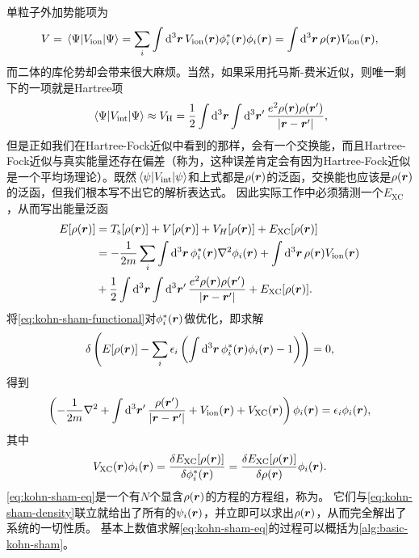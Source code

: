 单粒子外加势能项为
\begin{equation}
    V = \mel{\Psi}{{V}_\text{ion}}{\Psi} = \sum_i \int \dd[3]{\vb*{r}} V_{\text{ion}}(\vb*{r}) \phi_i^*(\vb*{r}) \phi_i(\vb*{r}) = \int \dd[3]{\vb*{r}} \rho(\vb*{r}) V_\text{ion}(\vb*{r}),
\end{equation}
而二体的库伦势却会带来很大麻烦。当然，如果采用托马斯-费米近似，则唯一剩下的一项就是Hartree项
\begin{equation}
    \mel{\Psi}{{V}_\text{int}}{\Psi} \approx V_{\text{H}} = \frac{1}{2} \int \dd[3]{\vb*{r}} \int \dd[3]{\vb*{r}'} \frac{e^2 \rho(\vb*{r}) \rho(\vb*{r}')}{\abs{\vb*{r} - \vb*{r}'}},
\end{equation}
但是正如我们在Hartree-Fock近似中看到的那样，会有一个交换能，而且Hartree-Fock近似与真实能量还存在偏差（称为，这种误差肯定会有因为Hartree-Fock近似是一个平均场理论）。既然$\mel{\psi}{{V}_\text{int}}{\psi}$和上式都是$\rho(\vb*{r})$的泛函，交换能也应该是$\rho(\vb*{r})$的泛函，但我们根本写不出它的解析表达式。
因此实际工作中必须猜测一个$E_\text{XC}$，从而写出能量泛函
\begin{equation}
    \begin{aligned}
        E[\rho(\vb*{r})] &= T_\text{s}[\rho(\vb*{r})] + V[\rho(\vb*{r})] + V_H[\rho(\vb*{r})] + E_\text{XC} [\rho(\vb*{r})] \\
        &= - \frac{1}{2m} \sum_i \int \dd[3]{\vb*{r}} \phi_i^*(\vb*{r}) \laplacian \phi_i(\vb*{r})
        + \int \dd[3]{\vb*{r}} \rho(\vb*{r}) V_\text{ion}(\vb*{r}) \\
        &+ \frac{1}{2} \int \dd[3]{\vb*{r}} \int \dd[3]{\vb*{r}'} \frac{e^2 \rho(\vb*{r}) \rho(\vb*{r}')}{\abs{\vb*{r} - \vb*{r}'}} + E_\text{XC} [\rho(\vb*{r})].
    \end{aligned}
    \label{eq:kohn-sham-functional}
\end{equation}
将\eqref{eq:kohn-sham-functional}对$\phi_i^*(\vb*{r})$做优化，即求解
\begin{equation}
    \var \left( E[\rho(\vb*{r})] - \sum_i \epsilon_i \left( \int \dd[3]{\vb*{r}} \phi_i^*(\vb*{r}) \phi_i(\vb*{r}) - 1 \right) \right) = 0,
    \label{eq:dft-variation-principle-shem}
\end{equation}
得到
\begin{equation}
    \left( - \frac{1}{2 m} \laplacian + \int \dd[3]{\vb*{r}'} \frac{\rho(\vb*{r}')}{\abs{\vb*{r} - \vb*{r}'}} + V_\text{ion}(\vb*{r}) + V_\text{XC}(\vb*{r}) \right) \phi_i(\vb*{r}) = \epsilon_i \phi_i(\vb*{r}),
    \label{eq:kohn-sham-eq}
\end{equation}
其中
\begin{equation}
    V_\text{XC}(\vb*{r}) \phi_i(\vb*{r}) = \fdv{E_\text{XC}[\rho(\vb*{r})]}{\phi^*_i(\vb*{r})} = \fdv{E_\text{XC}[\rho(\vb*{r})]}{\rho(\vb*{r})} \phi_i(\vb*{r}).
\end{equation}
\eqref{eq:kohn-sham-eq}是一个有$N$个显含$\rho(\vb*{r})$的方程的方程组，称为。
它们与\eqref{eq:kohn-sham-density}联立就给出了所有的$\psi_i(\vb*{r})$，并立即可以求出$\rho(\vb*{r})$，从而完全解出了系统的一切性质。
基本上数值求解\eqref{eq:kohn-sham-eq}的过程可以概括为\autoref{alg:basic-kohn-sham}。

